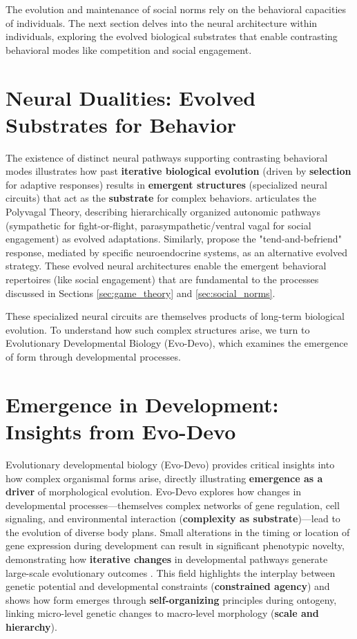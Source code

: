\documentclass[12pt,openany]{book}
\begin{document}
The evolution and maintenance of social norms rely on the behavioral capacities of individuals. The next section delves into the neural architecture within individuals, exploring the evolved biological substrates that enable contrasting behavioral modes like competition and social engagement.

\section{Neural Dualities: Evolved Substrates for Behavior} \label{sec:neural}
The existence of distinct neural pathways supporting contrasting behavioral modes illustrates how past \textbf{iterative biological evolution} (driven by \textbf{selection} for adaptive responses) results in \textbf{emergent structures} (specialized neural circuits) that act as the \textbf{substrate} for complex behaviors. \citet{porges2009polyvagal} articulates the Polyvagal Theory, describing hierarchically organized autonomic pathways (sympathetic for fight-or-flight, parasympathetic/ventral vagal for social engagement) as evolved adaptations. Similarly, \citet{taylor2000biobehavioral} propose the "tend-and-befriend" response, mediated by specific neuroendocrine systems, as an alternative evolved strategy. These evolved neural architectures enable the emergent behavioral repertoires (like social engagement) that are fundamental to the processes discussed in Sections \ref{sec:game_theory} and \ref{sec:social_norms}.

These specialized neural circuits are themselves products of long-term biological evolution. To understand how such complex structures arise, we turn to Evolutionary Developmental Biology (Evo-Devo), which examines the emergence of form through developmental processes.

\section{Emergence in Development: Insights from Evo-Devo} \label{sec:evodevo}
Evolutionary developmental biology (Evo-Devo) provides critical insights into how complex organismal forms arise, directly illustrating \textbf{emergence as a driver} of morphological evolution. Evo-Devo explores how changes in developmental processes---themselves complex networks of gene regulation, cell signaling, and environmental interaction (\textbf{complexity as substrate})---lead to the evolution of diverse body plans. Small alterations in the timing or location of gene expression during development can result in significant phenotypic novelty, demonstrating how \textbf{iterative changes} in developmental pathways generate large-scale evolutionary outcomes \citep{hall2003evo,davidson2006gene}. This field highlights the interplay between genetic potential and developmental constraints (\textbf{constrained agency}) and shows how form emerges through \textbf{self-organizing} principles during ontogeny, linking micro-level genetic changes to macro-level morphology (\textbf{scale and hierarchy}).
\end{document}
